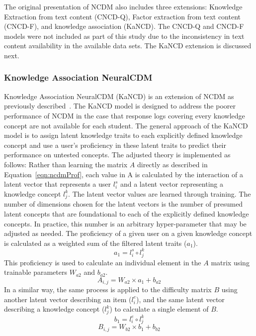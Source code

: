 \documentclass[letterpaper, 12pt, captions=tableabove]{scrreprt}
\begin{document}
The original presentation of NCDM also includes three extensions: Knowledge Extraction from text content (CNCD-Q), Factor extraction from text content (CNCD-F), and knowledge association (KaNCD). The CNCD-Q and CNCD-F models were not included as part of this study due to the inconsistency in text content availability in the available data sets. The KaNCD extension is discussed next.
			\subsubsection{Knowledge Association NeuralCDM}
			\label{sss:KaNCD}

				Knowledge Association NeuralCDM (KaNCD) is an extension of NCDM as previously described~\cite{wang2022}. The KaNCD model is designed to address the poorer performance of NCDM in the case that response logs covering every knowledge concept are not available for each student. The general approach of the KaNCD model is to assign latent knowledge traits to each explicitly defined knowledge concept and use a user's proficiency in these latent traits to predict their performance on untested concepts. The adjusted theory is implemented as follows: Rather than learning the matrix $A$ directly as described in Equation~\ref{eqn:ncdmProf}, each value in A is calculated by the interaction of a latent vector that represents a user $l^s_i$ and a latent vector representing a knowledge concept $l^k_j$. 
%
The latent vector values are learned through training. The number of dimensions chosen for the latent vectors is the number of presumed latent concepts that are foundational to each of the explicitly defined knowledge concepts. In practice, this number is an arbitrary hyper-parameter that may be adjusted as needed. The proficiency of a given user on a given knowledge concept is calculated as a weighted sum of the filtered latent traits ($a_1$).
\begin{equation}
	\label{eqn:kancdLatenta}
	a_1 = l^s_i \circ l^k_j
\end{equation}
This proficiency is used to calculate an individual element in the $A$ matrix using trainable parameters $W_{a2}$ and $b_{a2}$.
\begin{equation}
	\label{Eqn:kancdProf}
	A_{i,j} = W_{a2} \times a_1 + b_{a2}
\end{equation}
In a similar way, the same process is applied to the difficulty matrix $B$ using another latent vector describing an item ($l^e_i$), and the same latent vector describing a knowledge concept ($l^k_j$) to calculate a single element of $B$.
\begin{equation}
	\label{eqn:kancdKdiff1}
	b_1 = l^e_i \circ l^k_j
\end{equation}
\begin{equation}
	\label{eqn:kancdKdiff2}
	B_{i,j} = W_{b2} \times b_1 + b_{b2}
\end{equation}
\end{document}
